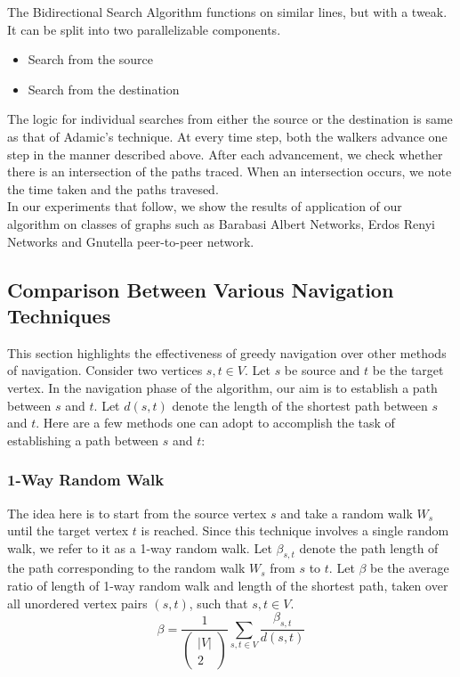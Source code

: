 \documentclass[a4paper,12pt]{article}
\begin{document}
The Bidirectional Search Algorithm functions on similar lines, but with a tweak. It can be split into two parallelizable components.

\begin{itemize}
\item Search from the source
\item Search from the destination
\end{itemize}

The logic for individual searches from either the source or the destination is same as that of Adamic's technique. At every time step, both the walkers advance one step in the manner described above. After each advancement, we check whether there is an intersection of the paths traced. When an intersection occurs, we note the time taken and the paths travesed.\\

In our experiments that follow, we show the results of application of our algorithm on classes of graphs such as Barabasi Albert Networks, Erdos Renyi Networks and Gnutella peer-to-peer network.

\subsection{Comparison Between Various Navigation Techniques}

This section highlights the effectiveness of greedy navigation over 
other methods of navigation. Consider two vertices $s,t \in V$. 
Let $s$ be source and $t$ be the target vertex. In the navigation phase 
of the algorithm, our aim is to establish a path between $s$ and 
$t$. Let $d(s,t)$ denote the length of the shortest path between $s$ and 
$t$. Here are a few methods one can adopt to accomplish the task of 
establishing a path between $s$ and $t$:

\subsubsection {1-Way Random Walk}
The idea here is to start from the source vertex $s$ and take a random walk 
$W_s$ until the target vertex $t$ is reached. Since this technique involves 
a single random walk, we refer to it as a 1-way random walk. Let 
$\beta_{s,t}$ denote the path length of the path corresponding to the random 
walk $W_s$ from $s$ to $t$. Let $\beta$ be the 
average ratio of length of 1-way random walk and length of the shortest 
path, taken over all unordered vertex pairs $(s,t)$, such that $s,t \in V$.
$$\beta = \frac{1}{\left(\begin{array}{c} |V|\\ 2\end{array}\right)} \sum_{s,t \in V} 
\frac{\beta_{s,t}}{d(s,t)}$$
\end{document}
